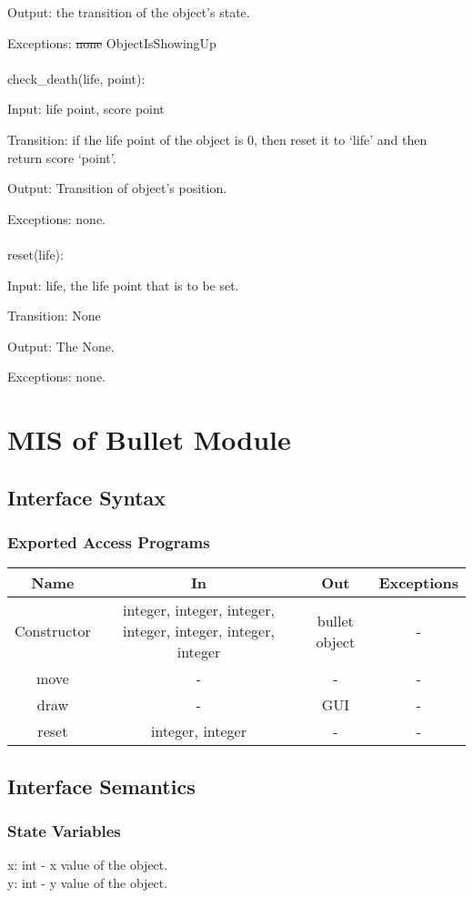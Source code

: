 \documentclass[12,english]{article}
\begin{document}
		Output: the transition of the object's state.
		
		Exceptions: \sout{none} {\color{red} ObjectIsShowingUp}\\
		\\
		check\_death(life, point):
		
		Input: life point, score point
		
		Transition: if the life point of the object is 0, then reset it to `life' and then return score `point'.
		
		Output: Transition of object's position.
		
		Exceptions: none.\\
		\\
		reset(life):
		
		Input: life, the life point that is to be set. 
		
		Transition: None
		
		Output: The None.
		
		Exceptions: none.
\section{MIS of Bullet Module}
		\subsection{Interface Syntax}
		\subsubsection{Exported Access Programs}
		\begin{tabular}[pos]{|c|c|c|c|}
			
			\hline
			\textbf{Name}& \textbf{In} & \textbf{Out} & \textbf{Exceptions} \\ \hline
			Constructor & integer, integer, integer, integer, integer, integer, integer & bullet object & -\\ \hline
			move & - & - & -\\ \hline
			draw & - & GUI & -\\ \hline
			reset & integer, integer & - & -\\ \hline

		\end{tabular}
		
		\subsection{Interface Semantics}
		\subsubsection{State Variables}
	    x: int - x value of the object.\\
		y: int - y value of the object.\\
\end{document}
